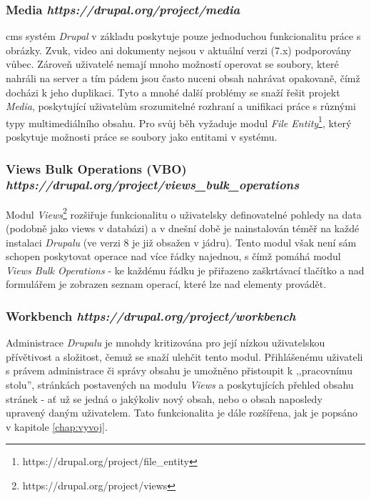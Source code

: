 \subsubsection*{\textbf{Media} \hfill \emph{https://drupal.org/project/media}}
\label{subsec:media}
\gls{cms} systém \emph{Drupal} v základu poskytuje pouze jednoduchou funkcionalitu práce s obrázky. Zvuk, video ani dokumenty nejsou v aktuální verzi (7.x) podporovány vůbec. Zároveň uživatelé nemají mnoho možností operovat se soubory, které nahráli na server a tím pádem jsou často nuceni obsah nahrávat opakovaně, čímž docházi k jeho duplikaci. Tyto a mnohé další problémy se snaží řešit projekt \emph{Media}, poskytující uživatelům srozumitelné rozhraní a unifikaci práce s různými typy multimediálního obsahu. Pro svůj běh vyžaduje modul \emph{File Entity}\footnote{https://drupal.org/project/file\_entity}, který poskytuje možnosti práce se soubory jako entitami v systému.

\subsubsection*{\textbf{Views Bulk Operations} (VBO) \hfill \emph{https://drupal.org/project/views\_bulk\_operations}}
\label{subsec:vbo}
Modul \emph{Views}\footnote{https://drupal.org/project/views} rozšiřuje funkcionalitu o uživatelsky definovatelné pohledy na data (podobně jako views v databázi) a v dnešní době je nainstalován téměř na každé instalaci \emph{Drupalu} (ve verzi 8 je již obsažen v jádru). Tento modul však není sám schopen poskytovat operace nad více řádky najednou, s čímž pomáhá modul \emph{Views Bulk Operations} - ke každému řádku je přiřazeno zaškrtávací tlačítko a nad formulářem je zobrazen seznam operací, které lze nad elementy provádět.

\subsubsection*{\textbf{Workbench} \hfill \emph{https://drupal.org/project/workbench}}
\label{subsec:workbench}
Administrace \emph{Drupalu} je mnohdy kritizována pro její nízkou uživatelskou přívětivost a složitost, čemuž se snaží ulehčit tento modul. Přihlášenému uživateli s právem administrace či správy obsahu je umožněno přistoupit k ,,pracovnímu stolu'', stránkách postavených na modulu \emph{Views} a poskytujících přehled obsahu stránek - ať už se jedná o jakýkoliv nový obsah, nebo o obsah naposledy upravený daným uživatelem. Tato funkcionalita je dále rozšířena, jak je popsáno v kapitole \ref{chap:vyvoj}.

